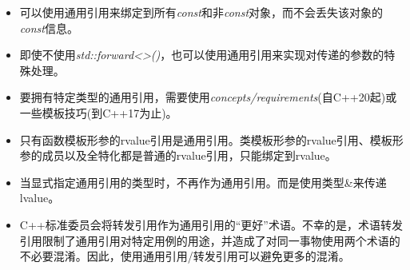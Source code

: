 \begin{itemize}
	\item 可以使用通用引用来绑定到所有\textit{const}和非\textit{const}对象，而不会丢失该对象的\textit{const}信息。
	\item 即使不使用\textit{std::forward<>()}，也可以使用通用引用来实现对传递的参数的特殊处理。
	\item 要拥有特定类型的通用引用，需要使用\textit{concepts/requirements}(自C++20起)或一些模板技巧(到C++17为止)。
	\item 只有函数模板形参的rvalue引用是通用引用。类模板形参的rvalue引用、模板形参的成员以及全特化都是普通的rvalue引用，只能绑定到rvalue。
	\item 当显式指定通用引用的类型时，不再作为通用引用。而是使用类型\&来传递lvalue。
	\item C++标准委员会将转发引用作为通用引用的“更好”术语。不幸的是，术语转发引用限制了通用引用对特定用例的用途，并造成了对同一事物使用两个术语的不必要混淆。因此，使用通用引用/转发引用可以避免更多的混淆。
\end{itemize}


\newpage